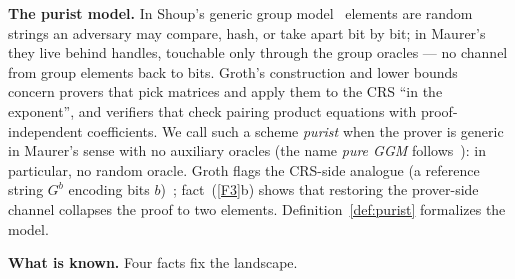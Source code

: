 \documentclass{aicr-conjecture}
\begin{document}
\smallskip
\noindent\textbf{The purist model.}
In Shoup's generic group model~\cite{Sho97} elements are random
strings an adversary may compare, hash, or take apart bit by bit; in
Maurer's~\cite{Mau05} they live behind handles, touchable only
through the group oracles --- no channel from group elements back to
bits.  Groth's construction and lower
bounds~\cite{Gro16} concern provers that pick matrices and apply
them to the CRS ``in the exponent'', and verifiers that check
pairing product equations with proof-independent coefficients.  We
call such a scheme \emph{purist} when the prover is generic in
Maurer's sense with no auxiliary oracles (the name \emph{pure GGM}
follows~\cite{ADY25}): in particular, no random oracle.  Groth flags
the CRS-side analogue (a reference string $G^b$ encoding bits
$b$)~\cite{Gro16}; fact~(\ref{F3}b) shows that restoring the
prover-side channel collapses the proof to two elements.
Definition~\ref{def:purist} formalizes the model.

\smallskip
\noindent\textbf{What is known.}
Four facts fix the landscape.
\end{document}
